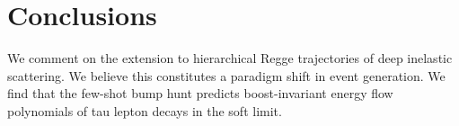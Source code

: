\section{Conclusions}\label{sec:conclusions}

We comment on the extension to hierarchical Regge trajectories of deep
inelastic scattering. We believe this constitutes a paradigm shift in
event generation. We find that the few-shot bump hunt predicts
boost-invariant energy flow polynomials of tau lepton decays in the soft
limit.

